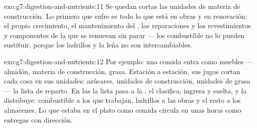 \begin{solution}{exo:g7:digestion-and-nutrients:11}
Se quedan cortas las unidades de materia de construcción. Lo primero
que sufre es todo lo que está en obras y en renovación: el propio
crecimiento, el mantenimiento del , las reparaciones y los
revestimientos y componentes de la  que se renuevan sin parar
--- los  combustible no lo pueden sustituir, porque los
ladrillos y la leña no son intercambiables.
\end{solution}

\begin{solution}{exo:g7:digestion-and-nutrients:12}
Por ejemplo: una comida entra como muebles --- almidón, materia de
construcción, grasa. Estación a estación, sus jugos cortan cada cosa en
sus unidades: azúcares, unidades de construcción, unidades de grasa ---
la lista de reparto. En las  la lista pasa a la , el
 clasifica, ingresa y suelta, y la  distribuye: combustible
a los  que trabajan, ladrillos a las obras y el resto a los
almacenes. Lo que estaba en el plato como comida circula en unas horas
como entregas con dirección.
\end{solution}

